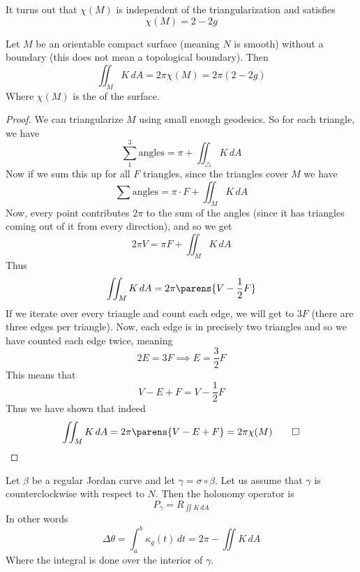 It turns out that $\chi(M)$ is independent of the triangularization and satisfies
\[ \chi(M) = 2-2g \]

\begin{coro*}

    Let $M$ be an orientable compact surface (meaning $N$ is smooth) without a boundary (this does not mean a topological boundary).
    Then
    \[ \iint_M K\,dA = 2\pi\chi(M) = 2\pi(2-2g) \]
    Where $\chi(M)$ is the  of the surface.

\end{coro*}

\begin{proof}

    We can triangularize $M$ using small enough geodesics.
    So for each triangle, we have
    \[ \sum_1^3\text{angles} = \pi + \iint_\triangle K\,dA \]
    Now if we sum this up for all $F$ triangles, since the triangles cover $M$ we have
    \[ \sum\text{angles} = \pi\cdot F + \iint_M K\,dA \]
    Now, every point contributes $2\pi$ to the sum of the angles (since it has triangles coming out of it from every direction), and so we get
    \[ 2\pi V = \pi F + \iint_M K\,dA \]
    Thus
    \[ \iint_M K\,dA = 2\pi\parens{V - \frac12F} \]
    If we iterate over every triangle and count each edge, we will get to $3F$ (there are three edges per triangle).
    Now, each edge is in precisely two triangles and so we have counted each edge twice, meaning
    \[ 2E = 3F \implies E = \frac32F \]
    This means that
    \[ V - E + F = V - \frac12F \]
    Thus we have shown that indeed
    \[ \iint_M K\,dA = 2\pi\parens{V - E + F} = 2\pi\chi(M) \qed \]

\end{proof}

\begin{coro*}

    Let $\beta$ be a regular Jordan curve and let $\gamma=\sigma\circ\beta$.
    Let us assume that $\gamma$ is counterclockwise with respect to $N$.
    Then the holonomy operator is
    \[ P_\gamma = R_{\iint K\,dA} \]
    In other words
    \[ \Delta\theta = \int_a^b\kappa_g(t)\,dt = 2\pi - \iint K\,dA \]
    Where the integral is done over the interior of $\gamma$.

\end{coro*}

